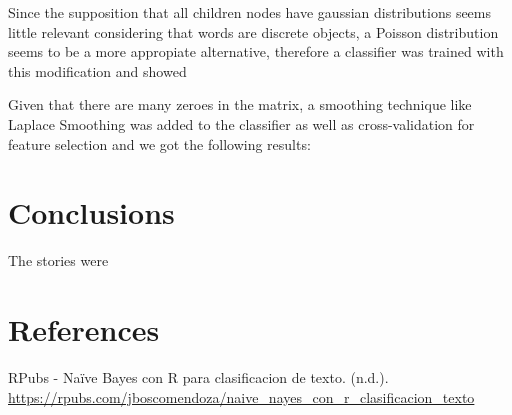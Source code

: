 \documentclass[twocolumn]{article}
\begin{document}
Since the supposition that all children nodes have gaussian distributions seems little relevant considering that words are discrete objects, a Poisson distribution seems to be a more appropiate alternative, therefore a classifier was trained with this modification and showed 


Given that there are many zeroes in the matrix, a smoothing technique like Laplace Smoothing was added to the classifier as well as cross-validation for feature selection and we got the following results:
\section{Conclusions}
The stories were 


\section{References}

\begin{thebibliography}{9}
\setlength{\itemsep}{0pt}
\setlength{\parskip}{0pt}


RPubs - Naïve Bayes con R para clasificacion de texto. (n.d.).
\url{https://rpubs.com/jboscomendoza/naive_nayes_con_r_clasificacion_texto}

\vspace{0.3cm}


\end{thebibliography}
\end{document}
